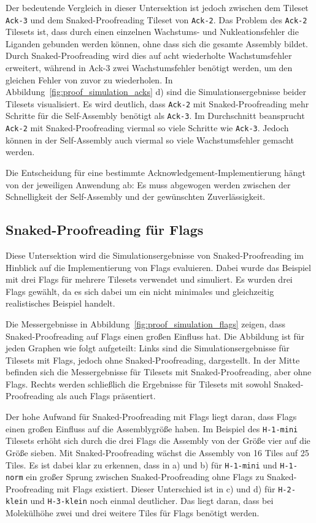 Der bedeutende Vergleich in dieser Untersektion ist jedoch zwischen dem Tileset \texttt{Ack-3} und dem Snaked-Proofreading Tileset von \texttt{Ack-2}. Das Problem des \texttt{Ack-2} Tilesets ist, dass durch einen einzelnen Wachstums- und Nukleationsfehler die Liganden gebunden werden können, ohne dass sich die gesamte Assembly bildet. Durch Snaked-Proofreading wird dies auf acht wiederholte Wachstumsfehler erweitert, während in Ack-3 zwei Wachstumsfehler benötigt werden, um den gleichen Fehler von zuvor zu wiederholen. In Abbildung~\ref{fig:proof_simulation_acks} d) sind die Simulationsergebnisse beider Tilesets visualisiert. Es wird deutlich, dass \texttt{Ack-2} mit Snaked-Proofreading mehr Schritte für die Self-Assembly benötigt als \texttt{Ack-3}. Im Durchschnitt beansprucht \texttt{Ack-2} mit Snaked-Proofreading viermal so viele Schritte wie \texttt{Ack-3}. Jedoch können in der Self-Assembly auch viermal so viele Wachstumsfehler gemacht werden. 

Die Entscheidung für eine bestimmte Acknowledgement-Implementierung hängt von der jeweiligen Anwendung ab: Es muss abgewogen werden zwischen der Schnelligkeit der Self-Assembly und der gewünschten Zuverlässigkeit.

\subsection{Snaked-Proofreading für Flags}

Diese Untersektion wird die Simulationsergebnisse von Snaked-Proofreading im Hinblick auf die Implementierung von Flags evaluieren. Dabei wurde das Beispiel mit drei Flags für mehrere Tilesets verwendet und simuliert. Es wurden drei Flags gewählt, da es sich dabei um ein nicht minimales und gleichzeitig realistisches Beispiel handelt.

Die Messergebnisse in Abbildung~\ref{fig:proof_simulation_flags} zeigen, dass Snaked-Proofreading auf Flags einen großen Einfluss hat. Die Abbildung ist für jeden Graphen wie folgt aufgeteilt: Links sind die Simulationsergebnisse für Tilesets mit Flags, jedoch ohne Snaked-Proofreading, dargestellt. In der Mitte befinden sich die Messergebnisse für Tilesets mit Snaked-Proofreading, aber ohne Flags. Rechts werden schließlich die Ergebnisse für Tilesets mit sowohl Snaked-Proofreading als auch Flags präsentiert. 

Der hohe Aufwand für Snaked-Proofreading mit Flags liegt daran, dass Flags einen großen Einfluss auf die Assemblygröße haben. Im Beispiel des \texttt{H-1-mini} Tilesets erhöht sich durch die drei Flags die Assembly von der Größe vier auf die Größe sieben. Mit Snaked-Proofreading wächst die Assembly von 16 Tiles auf 25 Tiles. Es ist dabei klar zu erkennen, dass in a) und b) für \texttt{H-1-mini} und \texttt{H-1-norm} ein großer Sprung zwischen Snaked-Proofreading ohne Flags zu Snaked-Proofreading mit Flags existiert. Dieser Unterschied ist in c) und d) für \texttt{H-2-klein} und \texttt{H-3-klein} noch einmal deutlicher. Das liegt daran, dass bei Molekülhöhe zwei und drei weitere Tiles für Flags benötigt werden.

